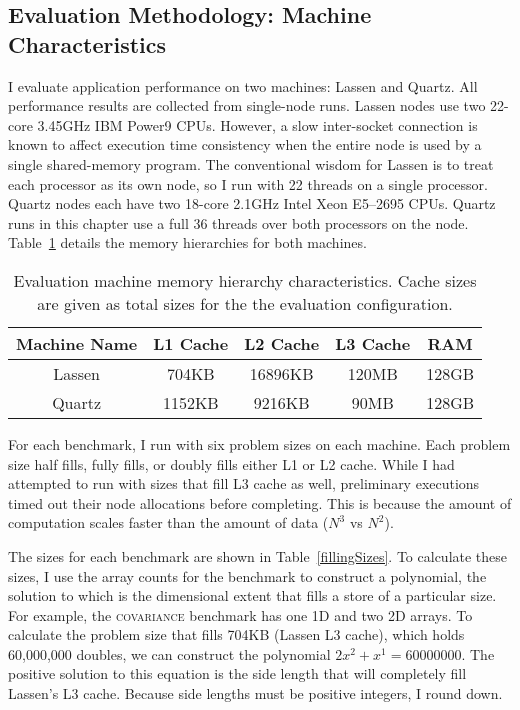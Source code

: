\subsection{Evaluation Methodology: Machine Characteristics}
\label{fillingSizesCalculation}
I evaluate application performance on two machines: Lassen and Quartz.
All performance results are collected from single-node runs.
Lassen nodes use two 22-core 3.45GHz IBM Power9 CPUs.
However, a slow inter-socket connection is known to affect execution time consistency when the entire node is used by a single shared-memory program.
The conventional wisdom for Lassen is to treat each processor as its own node, so I run with 22 threads on a single processor.
Quartz nodes each have two 18-core 2.1GHz Intel Xeon E5--2695  CPUs.
Quartz runs in this chapter use a full 36 threads over both processors on the node.
Table~\ref{machineDetails} details the memory hierarchies for both machines.

\begin{table}[t]
	\centering
\begin{tabular}{|c|c|c|c|c|}
\hline
\textbf{Machine Name} & \textbf{L1 Cache} & \textbf{L2 Cache} & \textbf{L3 Cache} & \textbf{RAM} \\
\hline 
Lassen & 704KB & 16896KB & 120MB & 128GB \\ %
\hline
Quartz & 1152KB & 9216KB & 90MB & 128GB \\ 
\hline
\end{tabular}
\caption{Evaluation machine memory hierarchy characteristics. Cache sizes are given as total sizes for the the evaluation configuration.}\label{machineDetails}
\end{table}

For each benchmark, I run with six problem sizes on each machine. 
Each problem size half fills, fully fills, or doubly fills either L1 or L2 cache.
While I had attempted to run with sizes that fill L3 cache as well, preliminary executions timed out their node allocations before completing.
This is because the amount of computation scales faster than the amount of data ($N^3$ vs $N^2$).


The sizes for each benchmark are shown in Table~\ref{fillingSizes}.
To calculate these sizes, I use the array counts for the benchmark to construct a polynomial, the solution to which is the dimensional extent that fills a store of a particular size.
For example, the \textsc{covariance} benchmark has one 1D and two 2D arrays. 
To calculate the problem size that fills 704KB (Lassen L3 cache), which holds 60,000,000 doubles, we can construct the polynomial $2x^2 + x^1 = 60000000$.
The positive solution to this equation is the side length that will completely fill Lassen's L3 cache.
Because side lengths must be positive integers, I round down.

